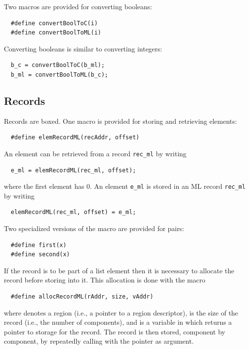 \documentclass[12pt]{book}
\begin{document}
Two macros are provided for converting booleans:
%
%
\begin{verbatim}
  #define convertBoolToC(i)
  #define convertBoolToML(i)
\end{verbatim}
Converting booleans is similar to converting integers:
\begin{verbatim}
  b_c = convertBoolToC(b_ml);
  b_ml = convertBoolToML(b_c);
\end{verbatim}

\subsection{Records}
Records are boxed. One macro is provided for storing and retrieving
elements:
%
\begin{verbatim}
  #define elemRecordML(recAddr, offset)
\end{verbatim}
An element can be retrieved from a record \verb|rec_ml| by writing
\begin{verbatim}
  e_ml = elemRecordML(rec_ml, offset);
\end{verbatim}
where the first element has  0. An element \verb|e_ml|
is stored in an ML record \verb|rec_ml| by writing
\begin{verbatim}
  elemRecordML(rec_ml, offset) = e_ml;
\end{verbatim}
Two specialized versions of the  macro are
provided for
%
%
pairs:
\begin{verbatim}
  #define first(x)
  #define second(x)
\end{verbatim}

If the record is to be part of a list element then it is necessary to allocate the record
before storing into it. This allocation is done with the macro
%
\begin{verbatim}
  #define allocRecordML(rAddr, size, vAddr)
\end{verbatim}
where  denotes a region (i.e., a pointer to a region
descriptor),  is the size of the record (i.e., the number
of components), and  is a variable in which
 returns a pointer to storage for the record. The
record is then stored, component by component, by repeatedly calling
 with the pointer  as argument.
\end{document}
